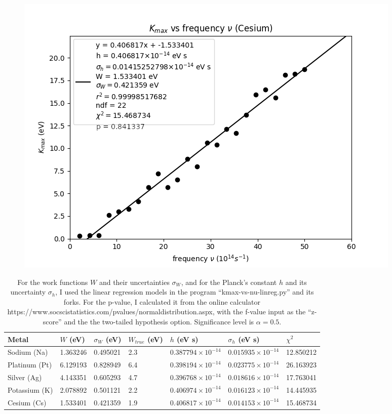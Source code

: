 \documentclass{article}
\begin{document}
\begin{itemize}
  \begin{figure}[ht!]
    \centering
    \includegraphics[scale=0.45]{cesium_plot_1.png}
  \end{figure}
  
  \pagebreak

  \begin{table}[ht]
    \begin{tabular}{|l|l|l|l|l|l|l|}
      \hline
      Metal & $W$ (eV) & $\sigma_W$ (eV) & $W_{true}$ (eV) & $h$ (eV s) & $\sigma_h$ (eV s) & $\chi^2$ \\ \hline
      Sodium (Na) & 1.363246 & 0.495021 & 2.3 & $0.387794 \times 10^{-14}$ & $0.015935\times 10^{-14}$ & 12.850212 \\ \hline
      Platinum (Pt) & 6.129193 & 0.828949 & 6.4 & $0.398194 \times 10^{-14}$ & $0.023775\times 10^{-14}$ & 26.163923 \\ \hline
      Silver (Ag) & 4.143351 & 0.605293 & 4.7 & $0.396768 \times 10^{-14}$ & $0.018616\times 10^{-14}$ & 17.763041 \\ \hline
      Potassium (K) & 2.078892 & 0.501121 & 2.2 & $0.406974 \times 10^{-14}$ & $0.016123\times 10^{-14}$ & 14.445935 \\ \hline
      Cesium (Cs) & 1.533401 & 0.421359 & 1.9 & $0.406817 \times 10^{-14}$ & $0.014153\times 10^{-14}$ & 15.468734 \\ \hline
    \end{tabular}
    \caption{For the work functions $W$ and their uncertainties $\sigma_W$, and for the Planck's constant $h$ and its uncertainty $\sigma_h$, I used the linear regression models in the program ``kmax-vs-nu-linreg.py'' and its forks. For the p-value, I calculated it from the online calculator https://www.socscistatistics.com/pvalues/normaldistribution.aspx, with the f-value input as the ``z-score'' and the the two-tailed hypothesis option. Significance level is $\alpha = 0.5$.}
  \end{table}


\end{itemize}
\end{document}
